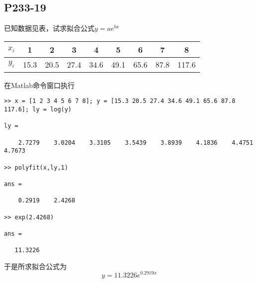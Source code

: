 \subsection{P233-19}
已知数据见表，试求拟合公式$y=a e^{b x}$
\begin{center}
\begin{tabular}{c|c c c c c c c c}
$x_i$ & 1    & 2    & 3    & 4    & 5    & 6    & 7    & 8 \\
\hline
$y_i$ & 15.3 & 20.5 & 27.4 & 34.6 & 49.1 & 65.6 & 87.8 & 117.6
\end{tabular}
\end{center}
\begin{SOLVE}
在Matlab命令窗口执行
\begin{lstlisting}
>> x = [1 2 3 4 5 6 7 8]; y = [15.3 20.5 27.4 34.6 49.1 65.6 87.8 117.6]; ly = log(y)

ly =

    2.7279    3.0204    3.3105    3.5439    3.8939    4.1836    4.4751    4.7673

>> polyfit(x,ly,1)

ans =

    0.2919    2.4268

>> exp(2.4268)

ans =

   11.3226
\end{lstlisting}
于是所求拟合公式为
\begin{displaymath}
y = 11.3226 e^{0.2919 x}
\end{displaymath}
\end{SOLVE}